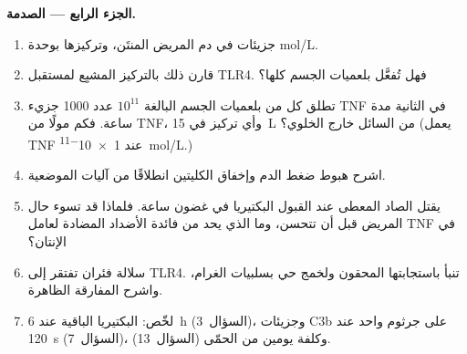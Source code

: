 \begin{problem}
\medskip
\noindent\textbf{الجزء الرابع --- الصدمة.}
\begin{enumerate}[resume]
  \item جزيئات  في دم المريض المنتَن،
        وتركيزها بوحدة mol/L.
  \item قارن ذلك بالتركيز المشبِع لمستقبل TLR4. فهل تُفعَّل
        بلعميات الجسم كلها؟
  \item تطلق كل  من بلعميات الجسم البالغة $10^{11}$
        عدد \num{1000} جزيء TNF في الثانية مدة ساعة. فكم
        مولًا من TNF، وأي تركيز في \qty{15}{L} من السائل خارج
        الخلوي؟ (يعمل TNF عند \qty{1e-11}{mol/L}.)
  \item اشرح هبوط ضغط الدم وإخفاق الكليتين انطلاقًا من
        آليات  الموضعية.
  \item يقتل الصاد المعطى عند القبول البكتيريا في غضون ساعة.
        فلماذا قد تسوء حال المريض قبل أن تتحسن، وما الذي يحد
        من فائدة الأضداد المضادة لعامل TNF في الإنتان؟
  \item سلالة فئران تفتقر إلى TLR4. تنبأ باستجابتها  المحقون ولخمج حي بسلبيات الغرام،
        واشرح المفارقة الظاهرة.
  \item لخّص: البكتيريا الباقية عند \qty{6}{h} (السؤال~3)،
        وجزيئات C3b على جرثوم واحد عند \qty{120}{s}
        (السؤال~7)، وكلفة يومين من الحمّى (السؤال~13).
\end{enumerate}
\end{problem}
